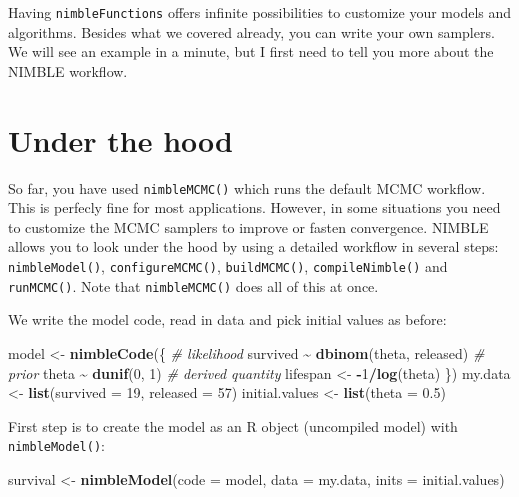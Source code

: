 \documentclass[
  12pt,
]{krantz}
\newenvironment{Shaded}{\begin{snugshade}}{\end{snugshade}}
\newcommand{\AttributeTok}[1]{\textcolor[rgb]{0.13,0.29,0.53}{#1}}
\newcommand{\CommentTok}[1]{\textcolor[rgb]{0.56,0.35,0.01}{\textit{#1}}}
\newcommand{\DecValTok}[1]{\textcolor[rgb]{0.00,0.00,0.81}{#1}}
\newcommand{\FloatTok}[1]{\textcolor[rgb]{0.00,0.00,0.81}{#1}}
\newcommand{\FunctionTok}[1]{\textcolor[rgb]{0.13,0.29,0.53}{\textbf{#1}}}
\newcommand{\NormalTok}[1]{#1}
\newcommand{\OtherTok}[1]{\textcolor[rgb]{0.56,0.35,0.01}{#1}}
\newcommand{\SpecialCharTok}[1]{\textcolor[rgb]{0.81,0.36,0.00}{\textbf{#1}}}
\begin{document}
Having \texttt{nimbleFunctions} offers infinite possibilities to customize your models and algorithms. Besides what we covered already, you can write your own samplers. We will see an example in a minute, but I first need to tell you more about the NIMBLE workflow.

\hypertarget{under-the-hood}{%
\section{Under the hood}\label{under-the-hood}}

So far, you have used \texttt{nimbleMCMC()} which runs the default MCMC workflow. This is perfecly fine for most applications. However, in some situations you need to customize the MCMC samplers to improve or fasten convergence. NIMBLE allows you to look under the hood by using a detailed workflow in several steps: \texttt{nimbleModel()}, \texttt{configureMCMC()}, \texttt{buildMCMC()}, \texttt{compileNimble()} and \texttt{runMCMC()}. Note that \texttt{nimbleMCMC()} does all of this at once.

We write the model code, read in data and pick initial values as before:

\begin{Shaded}
\begin{Highlighting}[]
\NormalTok{model }\OtherTok{\textless{}{-}} \FunctionTok{nimbleCode}\NormalTok{(\{}
  \CommentTok{\# likelihood}
\NormalTok{  survived }\SpecialCharTok{\textasciitilde{}} \FunctionTok{dbinom}\NormalTok{(theta, released)}
  \CommentTok{\# prior}
\NormalTok{  theta }\SpecialCharTok{\textasciitilde{}} \FunctionTok{dunif}\NormalTok{(}\DecValTok{0}\NormalTok{, }\DecValTok{1}\NormalTok{)}
  \CommentTok{\# derived quantity}
\NormalTok{  lifespan }\OtherTok{\textless{}{-}} \SpecialCharTok{{-}}\DecValTok{1}\SpecialCharTok{/}\FunctionTok{log}\NormalTok{(theta)}
\NormalTok{\})}
\NormalTok{my.data }\OtherTok{\textless{}{-}} \FunctionTok{list}\NormalTok{(}\AttributeTok{survived =} \DecValTok{19}\NormalTok{, }\AttributeTok{released =} \DecValTok{57}\NormalTok{)}
\NormalTok{initial.values }\OtherTok{\textless{}{-}} \FunctionTok{list}\NormalTok{(}\AttributeTok{theta =} \FloatTok{0.5}\NormalTok{)}
\end{Highlighting}
\end{Shaded}

First step is to create the model as an R object (uncompiled model) with \texttt{nimbleModel()}:

\begin{Shaded}
\begin{Highlighting}[]
\NormalTok{survival }\OtherTok{\textless{}{-}} \FunctionTok{nimbleModel}\NormalTok{(}\AttributeTok{code =}\NormalTok{ model,}
                        \AttributeTok{data =}\NormalTok{ my.data,}
                        \AttributeTok{inits =}\NormalTok{ initial.values)}
\end{Highlighting}
\end{Shaded}
\end{document}
